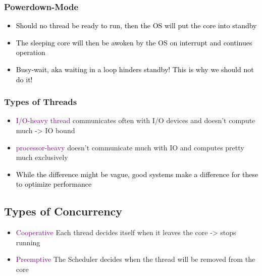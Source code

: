 \documentclass[main.tex,fontsize=8pt,paper=a4,paper=portrait,DIV=calc,]{scrartcl}
\begin{document}
\subsubsection{Powerdown-Mode}
\begin{itemize}
\item \textcolor{black}{Should no thread be ready to run, then the OS will put the core into standby}
\item \textcolor{black}{The sleeping core will then be awoken by the OS on interrupt and continues operation}
\item \textcolor{black}{Busy-wait, aka waiting in a loop hinders standby! This is why we should not do it!}
\end{itemize} 

\subsubsection{Types of Threads}
\begin{itemize}
\item \textcolor{purple}{I/O-heavy thread}\newline
  communicates often with I/O devices and doesn't compute much -> IO bound
\item \textcolor{purple}{processor-heavy}\newline
  doesn't communicate much with IO and computes pretty much exclusively
\item \textcolor{black}{While the difference might be vague, good systems make a difference for these to optimize performance}
\end{itemize} 

\subsection{Types of Concurrency}
\begin{itemize}
\item \textcolor{purple}{Cooperative}\newline
  Each thread decides itself when it leaves the core -> stops running
\item \textcolor{purple}{Preemptive}\newline
  The Scheduler decides when the thread will be removed from the core
\end{itemize} 
\end{document}
